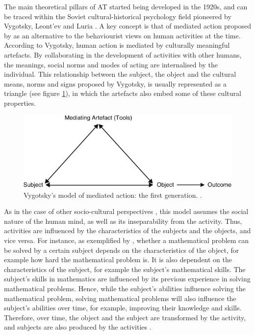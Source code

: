 The main theoretical pillars of AT started being developed in the 1920s, and can be traced within the Soviet cultural-historical psychology field pioneered by Vygotsky, Leont'ev and Luria \parencite{engestrom1999activity}. A key concept is that of mediated action proposed by \textcite{vygotsky1978mind} as an alternative to the behaviourist views on human activities at the time. According to Vygotsky, human action is mediated by culturally meaningful artefacts. By collaborating in the development of activities with other humans, the meanings, social norms and modes of acting are internalised by the individual. This relationship between the subject, the object and the cultural means, norms and signs proposed by Vygotsky, is usually represented as a triangle (see figure \ref{vygotsky-first-gen}), in which the artefacts also embed some of these cultural properties.

\begin{figure}[H]
	\centering
	\includegraphics[scale=0.6]{img/vigotsky_first_gen.png}
	\caption[Vygotsky's model of mediated action]%
	{Vygotsky's model of mediated action: the first generation. \textcite{flavin2012disruptive}.}
	\label{vygotsky-first-gen}
\end{figure}

As in the case of other socio-cultural perspectives \parencite{kaptelinin2012}, this model assumes the social nature of the human mind, as well as its inseparability from the activity. Thus, activities are influenced by the characteristics of the subjects and the objects, and vice versa. For instance, as exemplified by \textcite{kaptelinin2012}, whether a mathematical problem can be solved by a certain subject depends on the characteristics of the object, for example how hard the mathematical problem is. It is also dependent on the characteristics of the subject, for example the subject's mathematical skills. The subject's skills in mathematics are influenced by its previous experience in solving mathematical problems. Hence, while the subject's abilities influence solving the mathematical problem, solving mathematical problems will also influence the subject's abilities over time, for example, improving their knowledge and skills. Therefore, over time, the object and the subject are transformed by the activity, and subjects are also produced by the activities \parencite{kaptelinin2012}.


